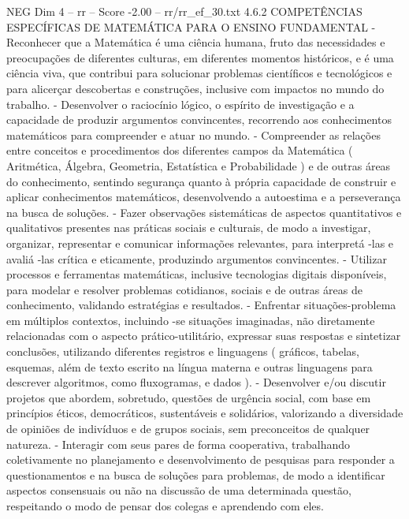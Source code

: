 \begin{textsample}{NEG Dim 4 – rr – Score -2.00 – rr/rr\_ef\_30.txt}  \label{ex:f4_neg_176}
4.6.2 COMPETÊNCIAS ESPECÍFICAS DE MATEMÁTICA PARA O ENSINO FUNDAMENTAL - Reconhecer que a Matemática é uma ciência humana, fruto das necessidades e preocupações de diferentes culturas, em diferentes momentos históricos, e é uma ciência viva, que contribui para solucionar problemas científicos e tecnológicos e para alicerçar descobertas e construções, inclusive com impactos no mundo do trabalho. - Desenvolver o raciocínio lógico, o espírito de investigação e a capacidade de produzir argumentos convincentes, recorrendo aos conhecimentos matemáticos para compreender e atuar no mundo. - Compreender as relações entre conceitos e procedimentos dos diferentes campos da Matemática ( Aritmética, Álgebra, Geometria, Estatística e Probabilidade ) e de outras áreas do conhecimento, sentindo segurança quanto à própria capacidade de construir e aplicar conhecimentos matemáticos, desenvolvendo a autoestima e a perseverança na busca de soluções. - Fazer observações sistemáticas de aspectos quantitativos e qualitativos presentes nas práticas sociais e culturais, de modo a investigar, organizar, representar e comunicar informações relevantes, para interpretá -las e avaliá -las crítica e eticamente, produzindo argumentos convincentes. - Utilizar processos e ferramentas matemáticas, inclusive tecnologias digitais disponíveis, para modelar e resolver problemas cotidianos, sociais e de outras áreas de conhecimento, validando estratégias e resultados. - Enfrentar situações-problema em múltiplos contextos, incluindo -se situações imaginadas, não diretamente relacionadas com o aspecto prático-utilitário, expressar suas respostas e sintetizar conclusões, utilizando diferentes registros e linguagens ( gráficos, tabelas, esquemas, além de texto escrito na língua materna e outras linguagens para descrever algoritmos, como fluxogramas, e dados ). - Desenvolver e/ou discutir projetos que abordem, sobretudo, questões de urgência social, com base em princípios éticos, democráticos, sustentáveis e solidários, valorizando a diversidade de opiniões de indivíduos e de grupos sociais, sem preconceitos de qualquer natureza. - Interagir com seus pares de forma cooperativa, trabalhando coletivamente no planejamento e desenvolvimento de pesquisas para responder a questionamentos e na busca de soluções para problemas, de modo a identificar aspectos consensuais ou não na discussão de uma determinada questão, respeitando o modo de pensar dos colegas e aprendendo com eles.

\end{textsample}
